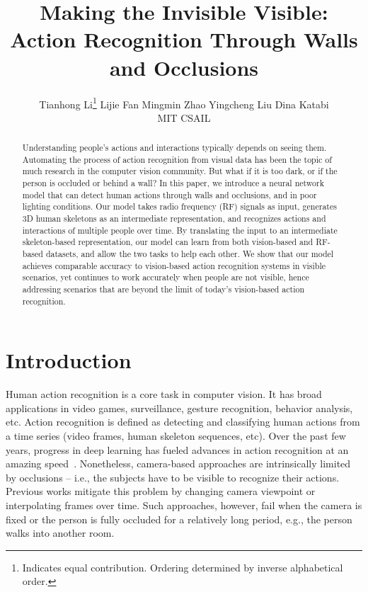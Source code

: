 \documentclass[10pt,twocolumn,letterpaper]{article}
\begin{document}
\title{Making the Invisible Visible:  Action Recognition Through Walls and Occlusions}
	
	\author{Tianhong Li\thanks{Indicates equal contribution. Ordering determined by inverse alphabetical order.} \quad Lijie Fan \quad Mingmin Zhao \quad Yingcheng Liu \quad Dina Katabi \\ MIT CSAIL}
	


	\maketitle



\begin{abstract}
	Understanding people's actions and interactions typically depends on seeing them. Automating the process of action recognition from visual data has been the topic of much research in the computer vision community.  But what if it is too dark, or if the person is occluded or behind a wall?  In this paper, we introduce a neural network model that can detect human actions through walls and occlusions, and in poor lighting conditions.  Our model takes radio frequency (RF) signals as input, generates 3D human skeletons as an intermediate representation, and recognizes actions and interactions of multiple people over time. By translating the input to an intermediate skeleton-based representation,  our model can learn from both vision-based and RF-based datasets, and allow the two tasks to help each other. We show that our model achieves comparable accuracy to vision-based action recognition systems in visible scenarios, yet continues to work accurately when people are not visible, hence addressing scenarios that are beyond the limit of today's vision-based action recognition. 

 \end{abstract}

\section{Introduction}
Human action recognition is a core task in computer vision. It has broad applications in video games, surveillance, gesture recognition, behavior analysis, etc.  Action recognition is defined as detecting and classifying human actions from a time series (video frames, human skeleton sequences, etc). Over the past few years, progress in deep learning has fueled advances in action recognition at an amazing speed~\cite{qiu2017learning,yue2015beyond,wang2016temporal,shahroudy2016ntu,zhu2016co,fan2018end, huang2018toward,du2015skeleton, fan2019controllable,li2018co,huang2017multi,ke2017new}. Nonetheless, camera-based approaches are intrinsically limited by occlusions -- i.e., the subjects have to be visible to recognize their actions. Previous works mitigate this problem by changing camera viewpoint or interpolating frames over time. Such approaches, however, fail when the camera is fixed or the person is fully occluded for a relatively long period, e.g., the person walks into another room.
\end{document}
